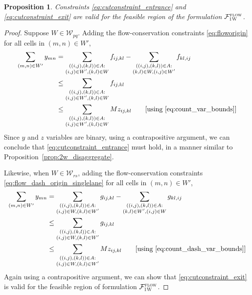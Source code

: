 \documentclass[10pt]{article}
\newcommand{\drivevar}[2]{y_{#1#2}}
\newcommand{\countvar}[4]{z_{#1#2,#3#4}}
\newcommand{\gridarcset}{A}
\newcommand{\entrancex}{p}
\newcommand{\entrancey}{q}
\newcommand{\exitx}{r}
\newcommand{\exity}{s}
\newcommand{\onewaypartitionsets}[1]{\mathcal{W}_{#1}}
\newcommand{\onewaypartition}{W}
\newcommand{\onewaypartitioncomp}{W'}
\newtheorem{proposition}{Proposition}
\theoremstyle{definition}
\begin{document}
\begin{proposition}
\label{prop:1w_aggregate}
Constraints \eqref{eq:cutconstraint_entrance} and \eqref{eq:cutconstraint_exit} are valid for the feasible region of the formulation $\mathcal{F}^{\textsc{flow}}_{\textsc{1W}}$.
\end{proposition}
\begin{proof}
Suppose $\onewaypartition \in \onewaypartitionsets{\entrancex \entrancey}$. Adding the flow-conservation constraints \eqref{eq:floworigin} for all cells in $(m, n) \in \onewaypartitioncomp$, 
\begin{align}
\sum_{(m,n) \in \onewaypartitioncomp} \drivevar{m}{n} & = \sum_{\substack{((i,j),(k,l)) \in \gridarcset: \\(i,j) \in \onewaypartitioncomp, (k, l) \in \onewaypartition}} f_{ij, kl} -
\sum_{\substack{((i,j),(k,l)) \in \gridarcset: \\(k, l) \in \onewaypartition, (i,j) \in \onewaypartitioncomp}} f_{kl, ij} \notag \\
& \leq \sum_{\substack{((i,j),(k,l)) \in \gridarcset: \\(i,j) \in \onewaypartitioncomp, (k, l) \in \onewaypartition}} f_{ij, kl} \notag \\
& \leq \sum_{\substack{((i,j),(k,l)) \in \gridarcset: \\(i,j) \in \onewaypartitioncomp, (k, l) \in \onewaypartition}} M \countvar{i}{j}{k}{l} \qquad \text{[using \eqref{eq:count_var_bounds}]} \label{eq:aggregate_vi_1w_a}
\end{align}
Since $y$ and $z$ variables are binary, using a contrapositive argument, we can conclude that \eqref{eq:cutconstraint_entrance} must hold, in a manner similar to Proposition~\ref{prop:2w_disaggregate}.

Likewise, when $\onewaypartition \in \onewaypartitionsets{\exitx \exity}$, adding the flow-conservation constraints \eqref{eq:flow_dash_origin_singlelane} for all cells in $(m, n) \in \onewaypartitioncomp$, 
\begin{align}
\sum_{(m,n) \in \onewaypartitioncomp} \drivevar{m}{n} & = \sum_{\substack{((i,j),(k,l)) \in \gridarcset: \\(i, j) \in \onewaypartition, (k,l) \in \onewaypartitioncomp}} g_{ij, kl} - \sum_{\substack{((i,j),(k,l)) \in \gridarcset: \\(k,l) \in \onewaypartitioncomp, (i, j) \in \onewaypartition}} g_{kl, ij} \notag \\
& \leq \sum_{\substack{((i,j),(k,l)) \in \gridarcset: \\(i, j) \in \onewaypartition, (k,l) \in \onewaypartitioncomp}} g_{ij, kl}  \notag \\
& \leq \sum_{\substack{((i,j),(k,l)) \in \gridarcset: \\(i, j) \in \onewaypartition, (k,l) \in \onewaypartitioncomp}} M \countvar{i}{j}{k}{l} \qquad \text{[using \eqref{eq:count_dash_var_bounds}]} \label{eq:aggregate_vi_1w_b}
\end{align}
Again using a contrapositive argument, we can show that \eqref{eq:cutconstraint_exit} is valid for the feasible region of formulation  $\mathcal{F}^{\textsc{flow}}_{\textsc{1W}}$.
\end{proof}
\end{document}
